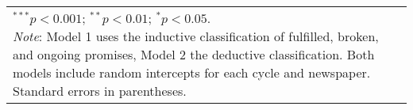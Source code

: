 \begin{table}[!h]
\begin{center}
\begin{footnotesize}
\begin{tabular}{l c c}
\hline
\multicolumn{3}{l}{\tiny{\parbox{.7\linewidth}{\footnotesize \vspace{2pt}$^{***}p<0.001$; $^{**}p<0.01$; $^{*}p<0.05$. \\
       \textit{Note}: Model 1 uses the inductive classification of fulfilled, broken, and ongoing promises, 
                      Model 2 the deductive classification.  
                      Both models include random intercepts for each cycle and newspaper. 
                      Standard errors in parentheses.}}}
\end{tabular}
\end{footnotesize}
\label{tab:reg_sentiment}
\end{center}
\end{table}
